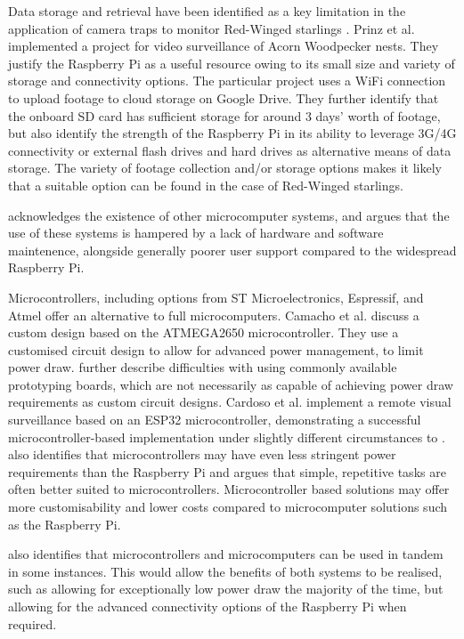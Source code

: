 \documentclass[class=report,11pt,crop=false]{standalone}
\begin{document}
Data storage and retrieval have been identified as a key limitation in the application of camera traps to monitor Red-Winged starlings \cite{hofmeyer2024private}. Prinz et al. \cite{prinz2016a} implemented a project for video surveillance of Acorn Woodpecker nests. They justify the Raspberry Pi as a useful resource owing to its small size and variety of storage and connectivity options. The particular project uses a WiFi connection to upload footage to cloud storage on Google Drive. They further identify that the onboard SD card has sufficient storage for around 3 days' worth of footage, but also identify the strength of the Raspberry Pi in its ability to leverage 3G/4G connectivity or external flash drives and hard drives as alternative means of data storage.  The variety of footage collection and/or storage options makes it likely that a suitable option can be found in the case of Red-Winged starlings.

\cite{jolles2021broad-scale} acknowledges the existence of other microcomputer systems, and argues that the use of these systems is hampered by a lack of hardware and software maintenence, alongside generally poorer user support compared to the widespread Raspberry Pi. 

Microcontrollers, including options from ST Microelectronics, Espressif, and Atmel offer an alternative to full microcomputers. Camacho et al. \cite{camacho2017deployment} discuss a custom design based on the ATMEGA2650 microcontroller. They use a customised circuit design to allow for advanced power management, to limit power draw. \cite{camacho2017deployment} further describe difficulties with using commonly available prototyping boards, which are not necessarily as capable of achieving power draw requirements as custom circuit designs. Cardoso et al. \cite{cardoso2022internet} implement a remote visual surveillance based on an ESP32 microcontroller, demonstrating a successful microcontroller-based implementation under slightly different circumstances to \cite{camacho2017deployment}. \cite{jolles2021broad-scale} also identifies that microcontrollers may have even less stringent power requirements than the Raspberry Pi and argues that simple, repetitive tasks are often better suited to microcontrollers. Microcontroller based solutions may offer more customisability and lower costs compared to microcomputer solutions such as the Raspberry Pi.

 \cite{jolles2021broad-scale} also identifies that microcontrollers and microcomputers can be used in tandem in some instances. This would allow the benefits of both systems to be realised, such as allowing for exceptionally low power draw the majority of the time, but allowing for the advanced connectivity options of the Raspberry Pi when required.
\end{document}
